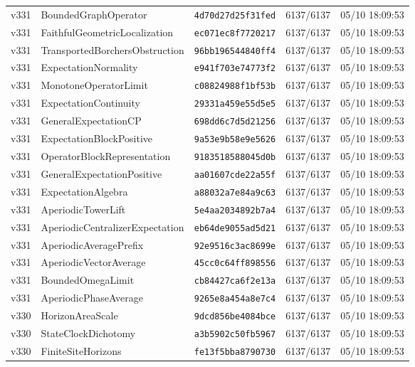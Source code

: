 \documentclass[11pt]{article}
\theoremstyle{definition}\newtheorem{deriv}{Derivation}
\begin{document}
{\begin{longtable}{@{}lllll@{}}
v331 & BoundedGraphOperator & \texttt{4d70d27d25f31fed} & 6137/6137 & 05/10 18:09:53 \\
v331 & FaithfulGeometricLocalization & \texttt{ec071ec8f7720217} & 6137/6137 & 05/10 18:09:53 \\
v331 & TransportedBorchersObstruction & \texttt{96bb196544840ff4} & 6137/6137 & 05/10 18:09:53 \\
v331 & ExpectationNormality & \texttt{e941f703e74773f2} & 6137/6137 & 05/10 18:09:53 \\
v331 & MonotoneOperatorLimit & \texttt{c08824988f1bf53b} & 6137/6137 & 05/10 18:09:53 \\
v331 & ExpectationContinuity & \texttt{29331a459e55d5e5} & 6137/6137 & 05/10 18:09:53 \\
v331 & GeneralExpectationCP & \texttt{698dd6c7d5d21256} & 6137/6137 & 05/10 18:09:53 \\
v331 & ExpectationBlockPositive & \texttt{9a53e9b58e9e5626} & 6137/6137 & 05/10 18:09:53 \\
v331 & OperatorBlockRepresentation & \texttt{9183518588045d0b} & 6137/6137 & 05/10 18:09:53 \\
v331 & GeneralExpectationPositive & \texttt{aa01607cde22a55f} & 6137/6137 & 05/10 18:09:53 \\
v331 & ExpectationAlgebra & \texttt{a88032a7e84a9c63} & 6137/6137 & 05/10 18:09:53 \\
v331 & AperiodicTowerLift & \texttt{5e4aa2034892b7a4} & 6137/6137 & 05/10 18:09:53 \\
v331 & AperiodicCentralizerExpectation & \texttt{eb64de9055ad5d21} & 6137/6137 & 05/10 18:09:53 \\
v331 & AperiodicAveragePrefix & \texttt{92e9516c3ac8699e} & 6137/6137 & 05/10 18:09:53 \\
v331 & AperiodicVectorAverage & \texttt{45cc0c64ff898556} & 6137/6137 & 05/10 18:09:53 \\
v331 & BoundedOmegaLimit & \texttt{cb84427ca6f2e13a} & 6137/6137 & 05/10 18:09:53 \\
v331 & AperiodicPhaseAverage & \texttt{9265e8a454a8e7c4} & 6137/6137 & 05/10 18:09:53 \\
v330 & HorizonAreaScale & \texttt{9dcd856be4084bce} & 6137/6137 & 05/10 18:09:53 \\
v330 & StateClockDichotomy & \texttt{a3b5902c50fb5967} & 6137/6137 & 05/10 18:09:53 \\
v330 & FiniteSiteHorizons & \texttt{fe13f5bba8790730} & 6137/6137 & 05/10 18:09:53 \\

\end{longtable}}
\end{document}

